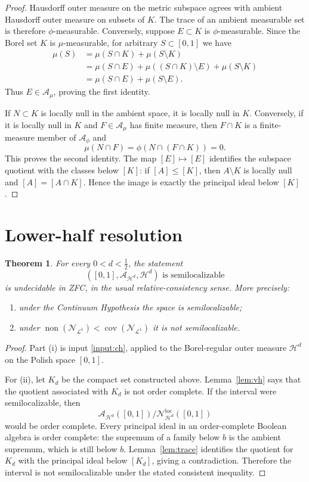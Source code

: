 \documentclass[11pt]{article}
\newtheorem{theorem}{Theorem}
\newcommand{\A}{\mathcal{A}}
\newcommand{\N}{\mathcal{N}}
\newcommand{\Hh}{\mathcal{H}}
\begin{document}
\begin{proof}
Hausdorff outer measure on the metric subspace agrees with ambient Hausdorff
outer measure on subsets of $K$.  The trace of an ambient measurable set is
therefore $\phi$-measurable.  Conversely, suppose $E\subset K$ is
$\phi$-measurable.  Since the Borel set $K$ is $\mu$-measurable, for arbitrary
$S\subset[0,1]$ we have
\begin{align*}
 \mu(S)
 &=\mu(S\cap K)+\mu(S\setminus K)\\
 &=\mu(S\cap E)+\mu((S\cap K)\setminus E)+\mu(S\setminus K)\\
 &=\mu(S\cap E)+\mu(S\setminus E).
\end{align*}
Thus $E\in\A_\mu$, proving the first identity.

If $N\subset K$ is locally null in the ambient space, it is locally null in
$K$.  Conversely, if it is locally null in $K$ and $F\in\A_\mu$ has finite
measure, then $F\cap K$ is a finite-measure member of $\A_\phi$ and
\[
 \mu(N\cap F)=\phi(N\cap(F\cap K))=0.
\]
This proves the second identity.  The map $[E]\mapsto[E]$ identifies the
subspace quotient with the classes below $[K]$: if $[A]\leq[K]$, then
$A\setminus K$ is locally null and $[A]=[A\cap K]$.  Hence the image is
exactly the principal ideal below $[K]$.
\end{proof}

\section*{Lower-half resolution}

\begin{theorem}\label{thm:main}
For every $0<d<\frac12$, the statement
\[
 ([0,1],\A_{\Hh^d},\Hh^d)\text{ is semilocalizable}
\]
is undecidable in ZFC, in the usual relative-consistency sense.  More
precisely:
\begin{enumerate}[label=\textup{(\roman*)}]
\item under the Continuum Hypothesis the space is semilocalizable;
\item under
$\operatorname{non}(\N_{\mathcal L^1})<
 \operatorname{cov}(\N_{\mathcal L^1})$
it is not semilocalizable.
\end{enumerate}
\end{theorem}

\begin{proof}
Part (i) is input \ref{input:ch}, applied to the Borel-regular outer measure
$\Hh^d$ on the Polish space $[0,1]$.

For (ii), let $K_d$ be the compact set constructed above.  Lemma~\ref{lem:vh}
says that the quotient associated with $K_d$ is not order complete.  If the
interval were semilocalizable, then
\[
 \A_{\Hh^d}([0,1]) / \N_{\Hh^d}^{\mathrm{loc}}([0,1])
\]
would be order complete.  Every principal ideal in an order-complete Boolean
algebra is order complete: the supremum of a family below $b$ is the ambient
supremum, which is still below $b$.  Lemma~\ref{lem:trace} identifies the
quotient for $K_d$ with the principal ideal below $[K_d]$, giving a
contradiction.  Therefore the interval is not semilocalizable under the
stated consistent inequality.
\end{proof}
\end{document}
